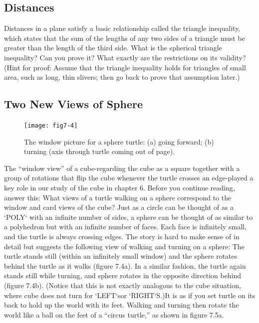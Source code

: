 \documentclass{book}
\begin{document}
\subsection{Distances}

Distances in a plane satisfy a basic relationship called the triangle inequality, which states that the sum of the lengths of any two sides of
a triangle must be greater than the length of the third side. What is
the spherical triangle inequality? Can you prove it? What exactly are
the restrictions on its validity? (Hint for proof: Assume that the triangle
inequality holds for triangles of small area, such as long, thin slivers;
then go back to prove that assumption later.)

\subsection{Two New Views of Sphere}

\begin{figure}
\begin{center}
\texttt{[image: fig7-4]}
\caption{The window picture for a sphere turtle: (a) going forward; (b) turning (axis through turtle coming out of page).}
\end{center}
\end{figure}

The ``window view'' of a cube-regarding the cube as a square together
with a group of rotations that flip the cube whenever the turtle crosses
an edge-played a key role in our study of the cube in chapter 6. Before
you continue reading, answer this: What views of a turtle walking on a
sphere correspond to the window and card views of the cube?
Just as a circle can be thought of as a \textsc{`POLY`} with an infinite number
of sides, a sphere can be thought of as similar to a polyhedron but with
an infinite number of faces. Each face is infinitely small, and the turtle
is always crossing edges. The story is hard to make sense of in detail
but suggests the following view of walking and turning on a sphere: The
turtle stands still (within an infinitely small window) and the sphere
rotates behind the turtle as it walks (figure 7.4a). In a similar fashion,
the turtle again stands still while turning, and sphere rotates in the
opposite direction behind (figure 7.4b). (Notice that this is not exactly
analogous to the cube situation, where cube does not turn for \textsc{`LEFT`}sor
\textsc{`RIGHT`}S.)It is as if you set turtle on its back to hold up the world with
its feet. Walking and turning then rotate the world like a ball on the
feet of a ``circus turtle,'' as shown in figure 7.5a.
\end{document}
